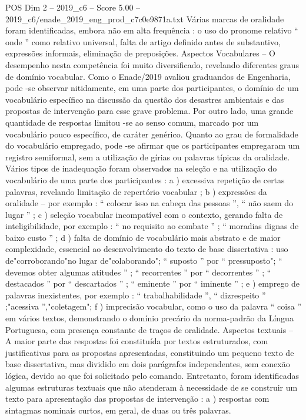 \begin{textsample}{POS Dim 2 – 2019\_c6 – Score 5.00 – 2019\_c6/enade\_2019\_eng\_prod\_c7c0e9871a.txt}
Várias marcas de oralidade foram identificadas, embora não em alta frequência : o uso do pronome relativo “ onde ” como relativo universal, falta de artigo definido antes de substantivo, expressões informais, eliminação de preposições.
Aspectos Vocabulares – O desempenho nesta competência foi muito diversificado, revelando diferentes graus de domínio vocabular.
Como o Enade/2019 avaliou graduandos de Engenharia, pode -se observar nitidamente, em uma parte dos participantes, o domínio de um vocabulário específico na discussão da questão dos desastres ambientais e das propostas de intervenção para esse grave problema.
Por outro lado, uma grande quantidade de respostas limitou -se ao senso comum, marcado por um vocabulário pouco específico, de caráter genérico.
Quanto ao grau de formalidade do vocabulário empregado, pode -se afirmar que os participantes empregaram um registro semiformal, sem a utilização de gírias ou palavras típicas da oralidade.
Vários tipos de inadequação foram observados na seleção e na utilização do vocabulário de uma parte dos participantes : a ) excessiva repetição de certas palavras, revelando limitação de repertório vocabular ; b ) expressões da oralidade – por exemplo : “ colocar isso na cabeça das pessoas ”, “ não saem do lugar ” ; c ) seleção vocabular incompatível com o contexto, gerando falta de inteligibilidade, por exemplo : “ no requisito ao combate ” ; “ moradias dignas de baixo custo ” ; d ) falta de domínio de vocabulário mais abstrato e de maior complexidade, essencial ao desenvolvimento do texto de base dissertativa : uso de"corroborando"no lugar de"colaborando"; “ suposto ” por “ pressuposto"; “ devemos obter algumas atitudes ” ; “ recorrentes ” por “ decorrentes ” ; “ destacados ” por “ descartados ” ; “ eminente ” por “ iminente ” ; e ) emprego de palavras inexistentes, por exemplo : “ trabalhabilidade ”, “ dizrespeito ” ;"acessiva ”,"coletagem"; f ) imprecisão vocabular, como o uso da palavra “ coisa ” em vários textos, demonstrando o domínio precário da norma-padrão da Língua Portuguesa, com presença constante de traços de oralidade.
Aspectos textuais – A maior parte das respostas foi constituída por textos estruturados, com justificativas para as propostas apresentadas, constituindo um pequeno texto de base dissertativa, mas dividido em dois parágrafos independentes, sem conexão lógica, devido ao que foi solicitado pelo comando.
Entretanto, foram identificadas algumas estruturas textuais que não atenderam à necessidade de se construir um texto para apresentação das propostas de intervenção : a ) respostas com sintagmas nominais curtos, em geral, de duas ou três palavras.

\end{textsample}
